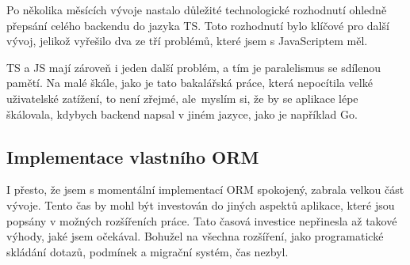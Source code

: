 Po několika měsících vývoje nastalo důležité technologické rozhodnutí ohledně přepsání celého backendu do jazyka TS. Toto rozhodnutí bylo klíčové pro další vývoj, jelikož vyřešilo dva ze tří problémů, které jsem s JavaScriptem měl.

TS a JS mají zároveň i jeden další problém, a tím je paralelismus se sdílenou pamětí. Na malé škále, jako je tato bakalářská práce, která nepocítila velké uživatelské zatížení, to není zřejmé, ale~myslím si, že by se aplikace lépe škálovala, kdybych backend napsal v jiném jazyce, jako je například Go.

\subsection{Implementace vlastního ORM}
I přesto, že jsem s momentální implementací ORM spokojený, zabrala velkou část vývoje. Tento čas by mohl být investován do jiných aspektů aplikace, které jsou popsány v možných rozšířeních práce. Tato časová investice nepřinesla až takové výhody, jaké jsem očekával. Bohužel na všechna rozšíření, jako programatické skládání dotazů, podmínek a migrační systém, čas nezbyl.
